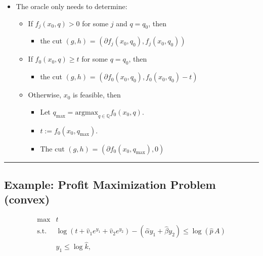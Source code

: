 \documentclass[]{article}
\providecommand{\tightlist}{%
  \setlength{\itemsep}{0pt}\setlength{\parskip}{0pt}}
\begin{document}
\begin{itemize}
\tightlist
\item
  The oracle only needs to determine:

  \begin{itemize}
  \tightlist
  \item
    If \(f_j(x_0, q) > 0\) for some \(j\) and \(q = q_0\), then

    \begin{itemize}
    \tightlist
    \item
      the cut \((g, h)\) = \((\partial f_j(x_0, q_0), f_j(x_0, q_0))\)
    \end{itemize}
  \item
    If \(f_0(x_0, q) \geq t\) for some \(q = q_0\), then

    \begin{itemize}
    \tightlist
    \item
      the cut \((g, h)\) =
      \((\partial f_0(x_0, q_0), f_0(x_0, q_0) - t)\)
    \end{itemize}
  \item
    Otherwise, \(x_0\) is feasible, then

    \begin{itemize}
    \tightlist
    \item
      Let \(q_{\max} = \text{argmax}_{q \in {\mathbb{Q}}} f_0(x_0, q)\).
    \item
      \(t := f_0(x_0, q_{\max})\).
    \item
      The cut \((g, h)\) = \((\partial f_0(x_0, q_{\max}), 0)\)
    \end{itemize}
  \end{itemize}
\end{itemize}

\begin{center}\rule{0.5\linewidth}{\linethickness}\end{center}

\hypertarget{example-profit-maximization-problem-convex}{%
\subsection{Example: Profit Maximization Problem
(convex)}\label{example-profit-maximization-problem-convex}}

\[\begin{array}{ll}
\text{max}  & t \\
\text{s.t.} & \log(t + \hat{v}_1 e^{y_1} + \hat{v}_2 e^{y_2}) - (\hat{\alpha} y_1 + \hat{\beta} y_2) \le \log(\hat{p}\,A)  \\
                  & y_1 \le \log \hat{k} ,
\end{array}\]
\end{document}
